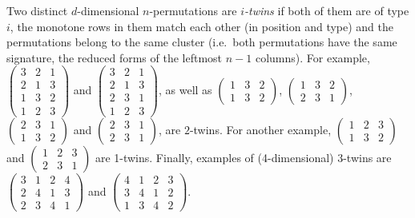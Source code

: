 \documentclass[12pt]{article}
\begin{document}
Two distinct $d$-dimensional $n$-permutations are {\em $i$-twins} if both of them are of type $i$, the monotone rows in them match each other (in position and type) and the permutations belong to the same cluster (i.e.\ both permutations have the same signature, the reduced forms of the leftmost $n-1$ columns). For example,  {\footnotesize $\left(\begin{array}{ccc} 3 & 2 & 1  \\ 2 & 1 & 3  \\ 1 & 3 & 2 \\ 1 & 2 & 3  \end{array}\right)$} and  {\footnotesize $\left(\begin{array}{ccc} 3 & 2 & 1  \\ 2 & 1 & 3  \\ 2 & 3 & 1 \\ 1 & 2 & 3  \end{array}\right)$}, as well as {\footnotesize $\left(\begin{array}{ccc} 1 & 3 & 2 \\ 1 & 3 & 2 \end{array}\right)$}, {\footnotesize $\left(\begin{array}{ccc} 1 & 3 & 2 \\ 2 & 3 & 1 \end{array}\right)$}, {\footnotesize $\left(\begin{array}{ccc} 2 & 3 & 1 \\ 1 & 3 & 2 \end{array}\right)$} and {\footnotesize $\left(\begin{array}{ccc} 2 & 3 & 1 \\ 2 & 3 & 1 \end{array}\right)$}, are $2$-twins. For another example,  {\footnotesize $\left(\begin{array}{ccc} 1 & 2 & 3 \\ 1 & 3 & 2 \end{array}\right)$} and  {\footnotesize $\left(\begin{array}{ccc} 1 & 2 & 3 \\ 2 & 3 & 1 \end{array}\right)$} are 1-twins. Finally, examples of (4-dimensional) 3-twins are  {\footnotesize $\left(\begin{array}{cccc} 3 & 1 & 2 & 4 \\ 2 & 4 & 1 & 3 \\ 2 & 3 & 4 & 1 \end{array}\right)$} and  {\footnotesize $\left(\begin{array}{cccc} 4 & 1 & 2 & 3 \\ 3 & 4 & 1 & 2 \\ 1 & 3 & 4 & 2 \end{array}\right)$}. 
\end{document}
